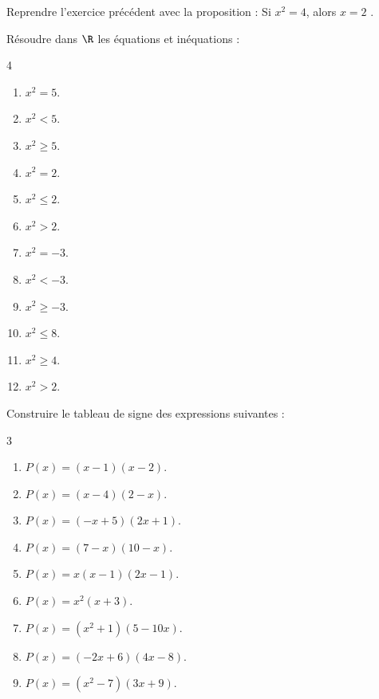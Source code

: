 \exo

Reprendre l'exercice précédent avec la proposition : \og Si $x^2=4$, alors $x=2$ \fg{}.

\exo

Résoudre dans $\R$ les équations et inéquations :

\vspace{-6pt}
\setlength{\columnsep}{1cm}
\setlength{\columnseprule}{0pt}
\begin{multicols}{4}
\begin{enumerate}
\item $x^2=5$.
\medskip
\item $x^2<5$.
\medskip
\item $x^2\geqslant 5$.
\item $x^2=2$.
\medskip
\item $x^2\leqslant 2$.
\medskip
\item $x^2>2$.
\item $x^2=-3$.
\medskip
\item $x^2<-3$.
\medskip
\item $x^2\geqslant -3$.
\item $x^2\leqslant 8$.
\medskip
\item $x^2\geqslant 4$.
\medskip
\item $x^2>2$.
\end{enumerate}
\end{multicols}
\vspace{-6pt}

\exo

Construire le tableau de signe des expressions suivantes :

\vspace{-6pt}
\setlength{\columnsep}{1cm}
\setlength{\columnseprule}{0pt}
\begin{multicols}{3}
\begin{enumerate}
\item $P(x)=(x-1)(x-2)$.
\medskip
\item $P(x)=(x-4)(2-x)$.
\medskip
\item $P(x)=(-x+5)(2x+1)$.
\medskip
\item $P(x)=(7-x)(10-x)$.
\medskip
\item $P(x)=x(x-1)(2x-1)$.
\medskip
\item $P(x)=x^2(x+3)$.
\medskip
\item $P(x)=(x^2+1)(5-10x)$.
\medskip
\item $P(x)=(-2x+6)(4x-8)$.
\medskip
\item $P(x)=(x^2-7)(3x+9)$.
\medskip
\end{enumerate}
\end{multicols}
\vspace{-6pt}

